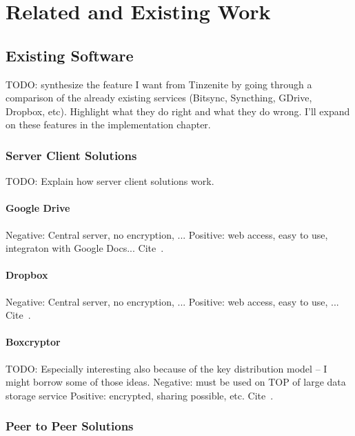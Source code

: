 \chapter{Related and Existing Work}
\label{chap:related}


\section{Existing Software}

TODO: synthesize the feature I want from Tinzenite by going through a comparison of the already existing services (Bitsync, Syncthing, GDrive, Dropbox, etc).
Highlight what they do right and what they do wrong.
I'll expand on these features in the implementation chapter.

\subsection{Server Client Solutions}

TODO: Explain how server client solutions work.

\subsubsection{Google Drive}

Negative: Central server, no encryption, ...
Positive: web access, easy to use, integraton with Google Docs...
Cite~\cite{web:site:gdrive}.

\subsubsection{Dropbox}

Negative: Central server, no encryption, ...
Positive: web access, easy to use, ...
Cite~\cite{web:site:dropbox}.

\subsubsection{Boxcryptor}

TODO: Especially interesting also because of the key distribution model – I might borrow some of those ideas.
Negative: must be used on TOP of large data storage service
Positive: encrypted, sharing possible, etc.
Cite~\cite{web:site:boxcryptor}.

\subsection{Peer to Peer Solutions}

